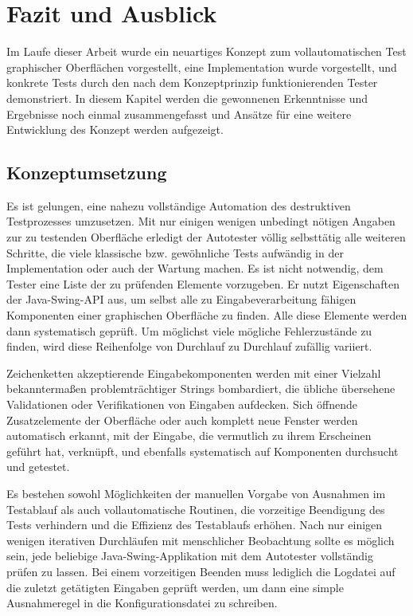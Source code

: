 \chapter{Fazit und Ausblick}\label{chapter:expansion}

Im Laufe dieser Arbeit wurde ein neuartiges Konzept zum vollautomatischen
Test graphischer Oberflächen vorgestellt, eine Implementation wurde
vorgestellt, und konkrete Tests durch den nach dem Konzeptprinzip
funktionierenden Tester demonstriert. In diesem Kapitel werden
die gewonnenen Erkenntnisse und Ergebnisse noch einmal zusammengefasst 
und Ansätze für eine weitere Entwicklung des Konzept werden aufgezeigt.


\section{Konzeptumsetzung}\label{section:conceptimplement}

Es ist gelungen, eine nahezu vollständige Automation des destruktiven
Testprozesses umzusetzen. Mit nur einigen wenigen unbedingt nötigen Angaben
zur zu testenden Oberfläche erledigt der Autotester völlig selbsttätig
alle weiteren Schritte, die viele klassische bzw. gewöhnliche Tests aufwändig
in der Implementation oder auch der Wartung machen. Es ist nicht notwendig,
dem Tester eine Liste der zu prüfenden Elemente vorzugeben. Er nutzt
Eigenschaften der Java-Swing-API aus, um selbst alle zu Eingabeverarbeitung
fähigen Komponenten einer graphischen Oberfläche zu finden. Alle diese
Elemente werden dann systematisch geprüft. Um möglichst viele
mögliche Fehlerzustände zu finden, wird diese Reihenfolge von Durchlauf
zu Durchlauf zufällig variiert.

Zeichenketten akzeptierende Eingabekomponenten werden mit einer
Vielzahl bekanntermaßen problemträchtiger Strings bombardiert,
die übliche übersehene Validationen oder Verifikationen von
Eingaben aufdecken. Sich öffnende Zusatzelemente der Oberfläche
oder auch komplett neue Fenster werden automatisch erkannt, mit
der Eingabe, die vermutlich zu ihrem Erscheinen geführt hat, verknüpft,
und ebenfalls systematisch auf Komponenten durchsucht und getestet.

Es bestehen sowohl Möglichkeiten der manuellen Vorgabe von
Ausnahmen im Testablauf als auch vollautomatische Routinen,
die vorzeitige Beendigung des Tests verhindern und die
Effizienz des Testablaufs erhöhen. Nach nur einigen wenigen iterativen
Durchläufen mit menschlicher Beobachtung sollte es möglich sein, 
jede beliebige Java-Swing-Applikation mit dem Autotester vollständig 
prüfen zu lassen. Bei einem vorzeitigen Beenden muss lediglich die
Logdatei auf die zuletzt getätigten Eingaben geprüft werden,
um dann eine simple Ausnahmeregel in die Konfigurationsdatei zu schreiben.

